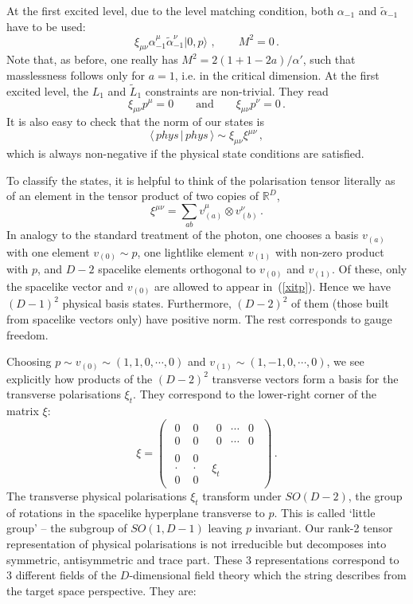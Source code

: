 \documentclass[12pt]{article}
\newcommand{\be}{\begin{equation}}
\newcommand{\ee}{\end{equation}}
\numberwithin{equation}{section}
\begin{document}
At the first excited level, due to the level matching condition, both $\alpha_{-1}$ and $\tilde{\alpha}_{-1}$ have to be used:
\be
\xi_{\mu\nu}\alpha_{-1}^\mu\tilde{\alpha}_{-1}^\nu|0,p\rangle\,\,,\qquad M^2=0\,.
\ee
Note that, as before, one really has $M^2=2(1+1-2a)/\alpha'$, such that masslessness follows only for $a=1$, i.e. in the critical dimension. At the first excited level, the $L_1$ and $\tilde{L}_1$ constraints are non-trivial. They read
\be
\xi_{\mu\nu}p^\mu=0\qquad\mbox{and}\qquad \xi_{\mu\nu}p^\nu=0\,.
\ee
It is also easy to check that the norm of our states is
\be
\langle \,phys\,|\,phys\,\rangle\sim \xi_{\mu\nu}\xi^{\mu\nu}\,,
\ee
which is always non-negative if the physical state conditions are satisfied. 

To classify the states, it is helpful to think of the polarisation tensor literally as of an element in the tensor product of two copies of ${\mathbb R}^D$,
\be
\xi^{\mu\nu}=\sum_{ab}v_{(a)}^\mu\otimes v_{(b)}^\nu\,.
\label{xitp}
\ee
In analogy to the standard treatment of the photon, one chooses a basis $v_{(a)}$ with one element $v_{(0)}\sim p$, one lightlike element $v_{(1)}$ with non-zero product with $p$, and $D-2$ spacelike elements orthogonal to $v_{(0)}$ and $v_{(1)}$. Of these, only the spacelike vector and $v_{(0)}$ are allowed to appear in~(\ref{xitp}). Hence we have $(D-1)^2$ physical basis states. Furthermore, $(D-2)^2$ of them (those built from spacelike vectors only) have positive norm. The rest corresponds to gauge freedom. 

Choosing $p\sim v_{(0)}\sim (1,1,0,\cdots,0)$ and $v_{(1)}\sim (1,-1,0,\cdots,0)$, we see explicitly how products of the $(D-2)^2$ transverse vectors form a basis for the transverse polarisations $\xi_t$. They correspond to the lower-right corner of the matrix $\xi$:
\be
\xi=\left(
\begin{array}{cc}
\begin{array}{cc}0&\,\,0\\0&\,\,0\end{array}
&
\begin{array}{ccc}0&\cdots&0\\0&\cdots&0\end{array}
\\
\begin{array}{cc}0&\,\,0\\ \cdot&\,\,\cdot\\0&\,\,0\end{array}
&
\xi_t
\end{array}
\right)\,.
\ee
The transverse physical polarisations $\xi_t$ transform under $SO(D-2)$, the group of rotations in the spacelike hyperplane transverse to $p$. This is called `little group' -- the subgroup of $SO(1,D-1)$ leaving $p$ invariant. Our rank-2 tensor representation of physical polarisations is not irreducible but decomposes into symmetric, antisymmetric and trace part. These 3 representations correspond to 3 different fields of the $D$-dimensional field theory which the string describes from the target space perspective. They are:
\end{document}
